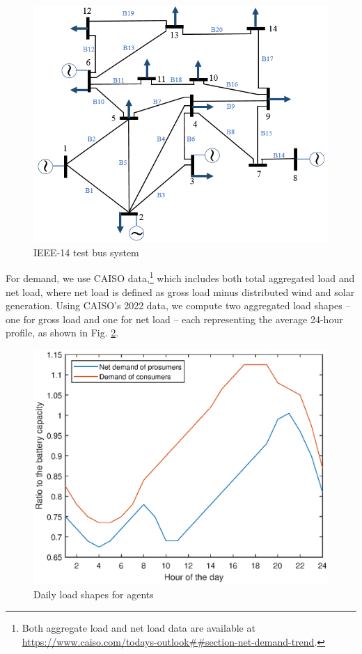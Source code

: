 \documentclass{article}
\theoremstyle{definition}
\theoremstyle{plain}
\begin{document}
\begin{figure}[!htb]
    \centering
    \includegraphics[scale =0.5]{IEEE-14.png}
    \caption{IEEE-14 test bus system}
    \label{fig:ieee14}
\end{figure}
For demand, we use CAISO data,\footnote{Both aggregate load and net load data are available at \url{https://www.caiso.com/todays-outlook##section-net-demand-trend}.} which includes both total aggregated load and net load, where net load is defined as gross load minus distributed wind and solar generation. Using CAISO's 2022 data, we compute two aggregated load shapes -- one for gross load and one for net load -- each representing the average 24-hour profile, as shown in Fig. \ref{fig:shape}.  
\begin{figure}[!htb]
\centering
    \includegraphics[scale=0.7]{shape.eps}
    \caption{Daily load shapes for agents} \label{fig:shape}
\end{figure}
\end{document}
